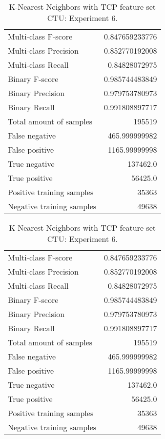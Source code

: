 \begin{table}[H]
\begin{minipage}{0.5\textwidth}
\caption{K-Nearest Neighbors with TCP feature set CTU: Experiment 5.}
\centering
\begin{tabular}{l r}
\toprule
Multi-class F-score & 0.847659233776 \\
Multi-class Precision & 0.852770192008 \\
Multi-class Recall & 0.84828072975 \\
\midrule
Binary F-score & 0.985744483849 \\
Binary Precision & 0.979753780973 \\
Binary Recall & 0.991808897717 \\
\midrule
Total amount of samples & 195519 \\
False negative & 465.999999982 \\
False positive & 1165.99999998 \\
True negative & 137462.0 \\
True positive & 56425.0 \\
\midrule
Positive training samples & 35363 \\
Negative training samples & 49638 \\
\bottomrule
\end{tabular}
\end{minipage}
\hfillx
\begin{minipage}{0.5\textwidth}
\caption{K-Nearest Neighbors with TCP feature set CTU: Experiment 6.}
\centering
\begin{tabular}{l r}
\toprule
Multi-class F-score & 0.847659233776 \\
Multi-class Precision & 0.852770192008 \\
Multi-class Recall & 0.84828072975 \\
\midrule
Binary F-score & 0.985744483849 \\
Binary Precision & 0.979753780973 \\
Binary Recall & 0.991808897717 \\
\midrule
Total amount of samples & 195519 \\
False negative & 465.999999982 \\
False positive & 1165.99999998 \\
True negative & 137462.0 \\
True positive & 56425.0 \\
\midrule
Positive training samples & 35363 \\
Negative training samples & 49638 \\
\bottomrule
\end{tabular}
\end{minipage}
\end{table}
